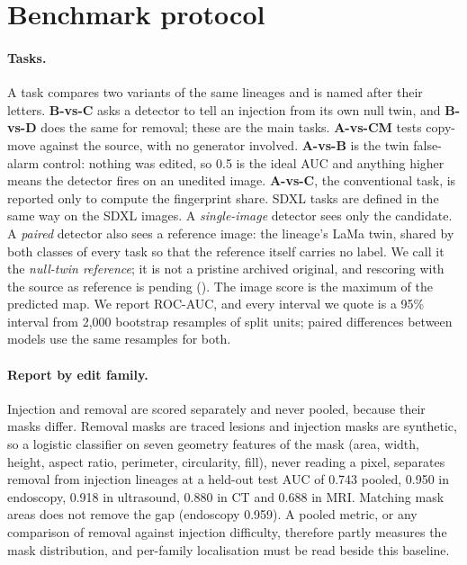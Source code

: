 \section{Benchmark protocol}
\label{sec:protocol}

\paragraph{Tasks.}
A task compares two variants of the same lineages and is named after their letters.
\textbf{B-vs-C} asks a detector to tell an injection from its own null twin, and \textbf{B-vs-D} does the same for removal; these are the main tasks.
\textbf{A-vs-CM} tests copy-move against the source, with no generator involved.
\textbf{A-vs-B} is the twin false-alarm control: nothing was edited, so 0.5 is the ideal AUC and anything higher means the detector fires on an unedited image.
\textbf{A-vs-C}, the conventional task, is reported only to compute the fingerprint share.
SDXL tasks are defined in the same way on the SDXL images.
A \emph{single-image} detector sees only the candidate.
A \emph{paired} detector also sees a reference image: the lineage's LaMa twin, shared by both classes of every task so that the reference itself carries no label.
We call it the \emph{null-twin reference}; it is not a pristine archived original, and rescoring with the source as reference is pending ().
The image score is the maximum of the predicted map.
We report ROC-AUC, and every interval we quote is a 95\% interval from 2,000 bootstrap resamples of split units; %
paired differences between models use the same resamples for both.

\paragraph{Report by edit family.}
\label{sec:family}
Injection and removal are scored separately and never pooled, because their masks differ.
Removal masks are traced lesions and injection masks are synthetic, so a logistic classifier on seven geometry features of the mask (area, width, height, aspect ratio, perimeter, circularity, fill), never reading a pixel, separates removal from injection lineages at a held-out test AUC of 0.743 pooled, %
0.950 in endoscopy, 0.918 in ultrasound, 0.880 in CT and 0.688 in MRI. %
Matching mask areas does not remove the gap (endoscopy 0.959). %
A pooled metric, or any comparison of removal against injection difficulty, therefore partly measures the mask distribution, and per-family localisation must be read beside this baseline.

